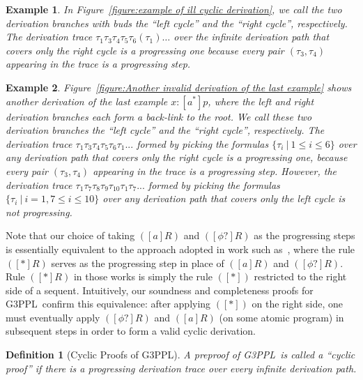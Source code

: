 \documentclass[manuscript,screen]{acmart}
\newtheorem{definition}{Definition}[section]
\newtheorem{example}{Example}[section]
\newcommand{\GiiiPPL}[0]{\mbox{G3PPL}}
\newcommand{\GiiiPPLcyc}[0]{\mbox{G3PPL}}
\begin{document}
\begin{example}
\label{ex:another invalid derivation of the last example}
In Figure~\ref{figure:example of ill cyclic derivation}, we call the two derivation branches with buds the ``left cycle'' and the ``right cycle'', respectively. 
The derivation trace $\tau_1\tau_3\tau_4\tau_5\tau_6(\tau_1)\ldots$ over the infinite derivation path that covers only the right cycle is a progressing one because every pair $(\tau_3, \tau_4)$ appearing in the trace is a progressing step. 
\end{example}

\ifx
\begin{example}
    \label{ex:another invalid derivation of the last example}
Figure~\ref{figure:Another invalid derivation of the last example} shows another derivation of the last example $x : [a^*]p$, where the left and right derivation branches each form a back-link to the root. We call these two derivation branches the ``left cycle'' and the ``right cycle'', respectively. 
The derivation trace $\tau_1\tau_3\tau_4\tau_5\tau_6\tau_1...$ formed by picking the formulas $\{\tau_i\ |\ 1\le i\le 6\}$ over any derivation path that covers only the right cycle is a progressing one, because every pair $(\tau_3, \tau_4)$ appearing in the trace is a progressing step. 
However, the derivation trace $\tau_1\tau_7\tau_8\tau_{9}\tau_{10}\tau_1\tau_7...$ formed by picking the formulas $\{\tau_i\ |\ i = 1, 7\le i\le 10\}$ over any derivation path that covers only the left cycle is not progressing.  
\end{example}
\fi

\ifx
Note that our choice of taking $([a]R)$ and $([\phi?]R)$ as the progressing steps is essentially equivalent to the approach adopted in work such as~\cite{Docherty19,Oda25}, where the rule $([*]R)$ serves as the progressing step in place of $([a]R)$ and $([\phi?]R)$. 
Rule $([*]R)$ in those works is simply the rule $([*])$ restricted to the right side of a sequent.
Intuitively, our soundness and completeness proofs for \GiiiPPLcyc\ confirm this equivalence: after applying $([*])$ on the right side, one must eventually apply $([\phi?]R)$ and $([a]R)$ (on some atomic program) in subsequent steps in order to form a valid cyclic derivation. 
\fi

\begin{definition}[Cyclic Proofs of \GiiiPPL]
\label{def:Cyclic Proofs of GiiiPPL}
A preproof of \GiiiPPL\ is called a ``cyclic proof'' if there is a progressing derivation trace over every infinite derivation path. 
\end{definition}
\end{document}
